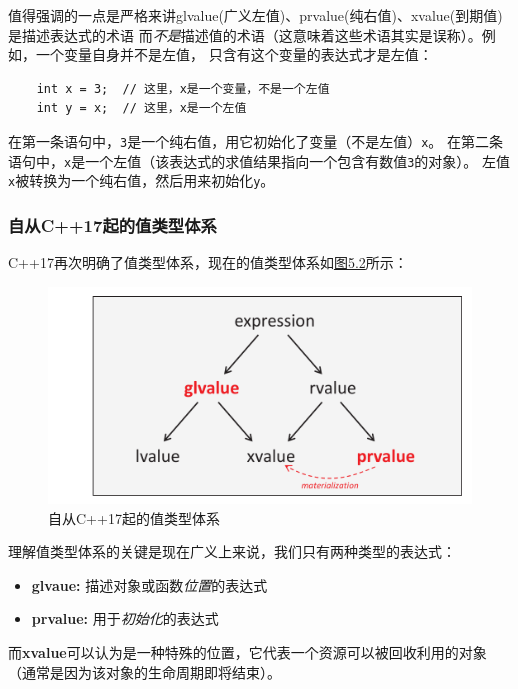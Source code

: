 值得强调的一点是严格来讲glvalue(广义左值)、prvalue(纯右值)、xvalue(到期值)是描述表达式的术语
而\emph{不是}描述值的术语（这意味着这些术语其实是误称）。例如，一个变量自身并不是左值，
只含有这个变量的表达式才是左值：
\begin{lstlisting}
    int x = 3;  // 这里，x是一个变量，不是一个左值
    int y = x;  // 这里，x是一个左值
\end{lstlisting}
在第一条语句中，\texttt{3}是一个纯右值，用它初始化了变量（不是左值）\texttt{x}。
在第二条语句中，\texttt{x}是一个左值（该表达式的求值结果指向一个包含有数值\texttt{3}的对象）。
左值\texttt{x}被转换为一个纯右值，然后用来初始化\texttt{y}。

\subsubsection{自从C++17起的值类型体系}
C++17再次明确了值类型体系，现在的值类型体系如\hyperref[f5.2]{图5.2}所示：

\begin{figure}[ht]
    \begin{center}
        \includegraphics[scale=0.8]{../imgs/5.2.png}
        \caption{自从C++17起的值类型体系}
        \label{f5.2}
    \end{center}
\end{figure}

理解值类型体系的关键是现在广义上来说，我们只有两种类型的表达式：
\begin{itemize}[leftmargin=*]
    \item \textbf{glvaue:} 描述对象或函数\emph{位置}的表达式
    \item \textbf{prvalue:} 用于\emph{初始化}的表达式
\end{itemize}
而\textbf{xvalue}可以认为是一种特殊的位置，它代表一个资源可以被回收利用的对象
（通常是因为该对象的生命周期即将结束）。

